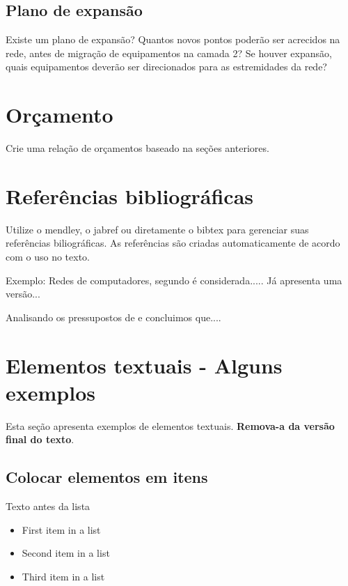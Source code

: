 \documentclass[	DIV=calc,%
							paper=a4,%
							fontsize=12pt,%
							onecolumn]{scrartcl}	 					%
\begin{document}
\subsection{Plano de expansão}
Existe um plano de expansão? Quantos novos pontos poderão ser acrecidos na rede, antes de migração de equipamentos na camada 2? Se houver expansão, quais equipamentos deverão ser direcionados para as estremidades da rede? 


\section{Orçamento}
Crie uma relação de orçamentos baseado na seções anteriores.

\section{Referências bibliográficas}
Utilize o mendley, o jabref ou diretamente o bibtex para gerenciar suas referências biliográficas. As referências são criadas automaticamente de acordo com o uso no texto.

Exemplo: Redes de computadores, segundo \cite{t2013} é considerada..... Já \cite{kurose2010} apresenta uma versão...

Analisando os pressupostos de \cite{ref3} e \cite{ref4} concluimos que....


\renewcommand\refname{} %

  


\section{Elementos textuais - Alguns exemplos}

Esta seção apresenta exemplos de elementos textuais. \textbf{Remova-a da versão final do texto}.


\subsection{Colocar elementos em itens}

Texto antes da lista

\begin{itemize}
	\item First item in a list 
	\item Second item in a list 
	\item Third item in a list
\end{itemize}
\end{document}
